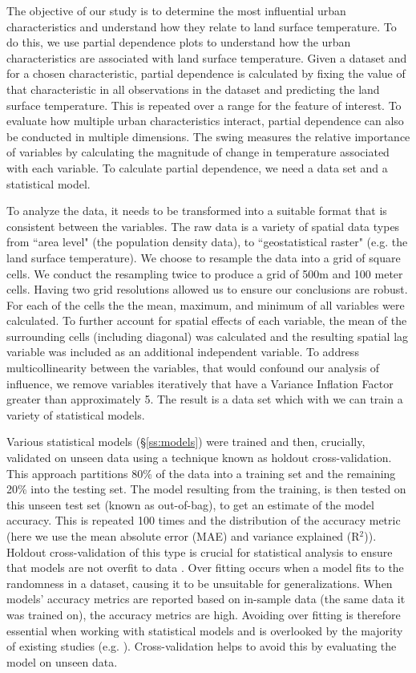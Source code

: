 \documentclass[final,3p,times,twocolumn,sort&compress]{elsarticle}
\begin{document}
The objective of our study is to determine the most influential urban characteristics and understand how they relate to land surface temperature.
To do this, we use partial dependence plots to understand how the urban characteristics are associated with land surface temperature.
Given a dataset and for a chosen characteristic, partial dependence is calculated by fixing the value of that characteristic in all observations in the dataset and predicting the land surface temperature. 
This is repeated over a range for the feature of interest.
To evaluate how multiple urban characteristics interact, partial dependence can also be conducted in multiple dimensions.
The swing \cite{Shortridge2015-ub} measures the relative importance of variables by calculating the magnitude of change in temperature associated with each variable.
To calculate partial dependence, we need a data set and a statistical model.

To analyze the data, it needs to be transformed into a suitable format that is consistent between the variables.
The raw data is a variety of spatial data types from ``area level" (the population density data), to ``geostatistical raster" (e.g. the land surface temperature).
We choose to resample the data into a grid of square cells.
We conduct the resampling twice to produce a grid of 500m and 100 meter cells. 
Having two grid resolutions allowed us to ensure our conclusions are robust.
For each of the cells the the mean, maximum, and minimum of all variables were calculated. 
To further account for spatial effects of each variable, the mean of the surrounding cells (including diagonal) was calculated and the resulting spatial lag variable was included as an additional independent variable. 
To address multicollinearity between the variables, that would confound our analysis of influence, we remove variables iteratively that have a Variance Inflation Factor greater than approximately 5.
The result is a data set which with we can train a variety of statistical models.

Various statistical models (\S \ref{ss:models}) were trained and then, crucially, validated on unseen data using a technique known as holdout cross-validation. 
This approach partitions 80\% of the data into a training set and the remaining 20\% into the testing set.
The model resulting from the training, is then tested on this unseen test set (known as out-of-bag), to get an estimate of the model accuracy.
This is repeated 100 times and the distribution of the accuracy metric (here we use the mean absolute error (MAE) and variance explained (R$^2$)).
Holdout cross-validation of this type is crucial for statistical analysis to ensure that models are not overfit to data \cite{Geron2017-ek}.
Over fitting occurs when a model fits to the randomness in a dataset, causing it to be unsuitable for generalizations. 
When models' accuracy metrics are reported based on in-sample data (the same data it was trained on), the accuracy metrics are high.
Avoiding over fitting is therefore essential when working with statistical models and is overlooked by the majority of existing studies (e.g. \cite{Zhou2014-wc, Peng2018-cp, Chun2017-mm, Chun2018-so,Wang2019-tree}).
Cross-validation helps to avoid this by evaluating the model on unseen data.
\end{document}
